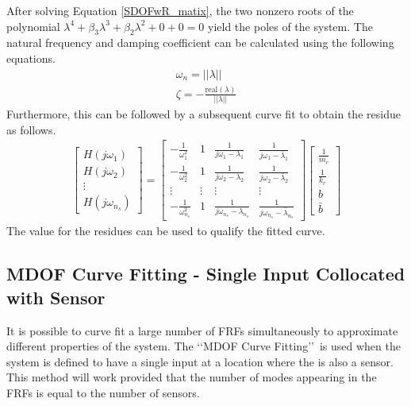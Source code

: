 \documentclass[paper=a4, fontsize=12pt]{scrartcl} %
\begin{document}
%
After solving Equation \eqref{SDOFwR_matix}, the two nonzero roots of the polynomial $\lambda^4 + \beta_3 \lambda^3 + \beta_2 \lambda^2 + 0 + 0 = 0$ yield the poles of the system. The natural frequency and damping coefficient can be calculated using the following equations.
%
\begin{subequations}
\begin{align}
	\omega_n = ||\lambda|| \\
	\zeta = -\frac{\text{real}(\lambda)}{||\lambda||}
\end{align}
\end{subequations}
%
Furthermore, this can be followed by a subsequent curve fit to obtain the residue as follows.
%
\begin{gather}
\begin{bmatrix}
	H(j\omega_1) \\
	H(j\omega_2) \\
	\vdots \\
	H(j\omega_{n_s})
\end{bmatrix}
=
\begin{bmatrix}
	-\frac{1}{\omega_1^2} & 1 & \frac{1}{j\omega_1 - \lambda_1} & \frac{1}{j
	\omega_1 - \bar{\lambda}_1} \\
	-\frac{1}{\omega_2^2} & 1 & \frac{1}{j\omega_2 - \lambda_2} & \frac{1}{j
	\omega_2 - \bar{\lambda}_2} \\
	\vdots & \vdots & \vdots & \vdots \\
	-\frac{1}{\omega_{n_s}^2} & 1 & \frac{1}{j\omega_{n_s} - \lambda_{n_s}} & 
	\frac{1}{j\omega_{n_s} - \bar{\lambda}_{n_s}}
\end{bmatrix}
\begin{bmatrix}
	\frac{1}{m_r} \\
	\frac{1}{k_r} \\
	b \\
	\bar{b}
\end{bmatrix}
\end{gather}
%
The value for the residues can be used to qualify the fitted curve.
\subsection*{MDOF Curve Fitting - Single Input Collocated with Sensor}
It is possible to curve fit a large number of FRFs simultaneously to approximate different properties of the system. The \lq\lq MDOF Curve Fitting\rq\rq\ is used when the system is defined to have a single input at a location where the is also a sensor. This method will work provided that the number of modes appearing in the FRFs is equal to the number of sensors.\\
\end{document}
